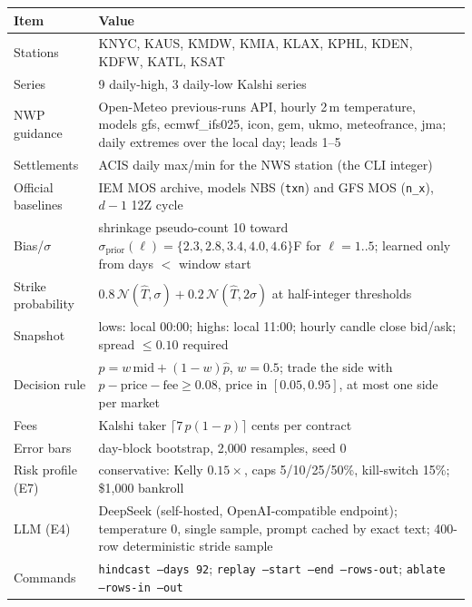 \documentclass[sigconf,review,anonymous]{acmart}
\begin{document}
\begin{center}
\small
\begin{tabular}{@{}p{3.2cm}p{4.6cm}@{}}
\toprule
\textbf{Item} & \textbf{Value} \\
\midrule
Stations & KNYC, KAUS, KMDW, KMIA, KLAX, KPHL, KDEN, KDFW, KATL, KSAT \\
Series & 9 daily-high, 3 daily-low Kalshi series \\
NWP guidance & Open-Meteo previous-runs API, hourly 2\,m temperature, models gfs, ecmwf\_ifs025, icon, gem, ukmo, meteofrance, jma; daily extremes over the local day; leads 1--5 \\
Settlements & ACIS daily max/min for the NWS station (the CLI integer) \\
Official baselines & IEM MOS archive, models NBS (\texttt{txn}) and GFS MOS (\texttt{n\_x}), $d\!-\!1$ 12Z cycle \\
Bias/$\sigma$ & shrinkage pseudo-count 10 toward $\sigma_{\text{prior}}(\ell)=\{2.3, 2.8, 3.4, 4.0, 4.6\}$\textdegree{}F for $\ell=1..5$; learned only from days $<$ window start \\
Strike probability & $0.8\,\mathcal N(\hat T,\sigma)+0.2\,\mathcal N(\hat T,2\sigma)$ at half-integer thresholds \\
Snapshot & lows: local 00:00; highs: local 11:00; hourly candle close bid/ask; spread $\le 0.10$ required \\
Decision rule & $p = w\,\text{mid} + (1-w)\hat p$, $w=0.5$; trade the side with $p - \text{price} - \text{fee} \ge 0.08$, price in $[0.05,0.95]$, at most one side per market \\
Fees & Kalshi taker $\lceil 7\,p(1-p)\rceil$ cents per contract \\
Error bars & day-block bootstrap, 2{,}000 resamples, seed 0 \\
Risk profile (E7) & conservative: Kelly $0.15\times$, caps 5/10/25/50\%, kill-switch 15\%; \$1{,}000 bankroll \\
LLM (E4) & DeepSeek (self-hosted, OpenAI-compatible endpoint); temperature 0, single sample, prompt cached by exact text; 400-row deterministic stride sample \\
Commands & \texttt{hindcast --days 92}; \texttt{replay --start --end --rows-out}; \texttt{ablate --rows-in --out} \\
\bottomrule
\end{tabular}
\end{center}
\end{document}
